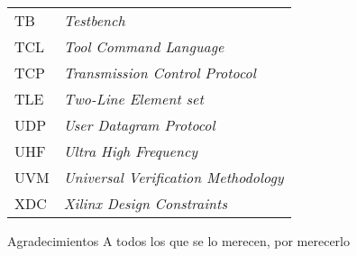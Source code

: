\documentclass[screen, pagebackref,oneside]{ibtesis}
\begin{document}
\begin{preliminary}
\begin{abreviaturas}
\begin{longtable}{ll}
            TB  &   \textit{Testbench}  \\
            TCL &   \textit{Tool Command Language}  \\
            TCP &   \textit{Transmission Control Protocol}  \\
            TLE &   \textit{Two-Line Element set}   \\
            UDP &   \textit{User Datagram Protocol} \\
            UHF &   \textit{Ultra High Frequency}   \\
            UVM &   \textit{Universal Verification Methodology} \\
            XDC &   \textit{Xilinx Design Constraints}
        \end{longtable}
    \end{abreviaturas}
    
    \tableofcontents                %
    \listoffigures                  %
    \listoftables                   %
    
    
\end{preliminary}











\appendix


\begin{biblio}
    
\end{biblio}

\begin{postliminary}

    \begin{seccion}{Agradecimientos}
    A todos los que se lo merecen, por merecerlo
    \end{seccion}
    
\end{postliminary}
    
\end{document}
